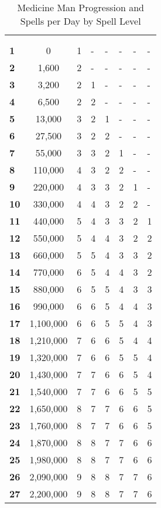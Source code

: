 \begin{multicols*}{2}
\begin {table}[H]
  \caption{Medicine Man Progression and Spells per Day by Spell Level}
  \begin{tabularx}{\columnwidth}{>{\bfseries}YcYYYYYY}
		\thead{} & \thead{} & \\
		 &  &  &  &  &  &  & \\
		1 & 0 & 1 & - & - & - & - & -\\
		2 & 1,600 & 2 & - & - & - & - & -\\
		3 & 3,200 & 2 & 1 & - & - & - & -\\
		4 & 6,500 & 2 & 2 & - & - & - & -\\
		5 & 13,000 & 3 & 2 & 1 & - & - & -\\
		6 & 27,500 & 3 & 2 & 2 & - & - & -\\
		7 & 55,000 & 3 & 3 & 2 & 1 & - & -\\
		8 & 110,000 & 4 & 3 & 2 & 2 & - & -\\
		9 & 220,000 & 4 & 3 & 3 & 2 & 1 & -\\
		10 & 330,000 & 4 & 4 & 3 & 2 & 2 & -\\
		11 & 440,000 & 5 & 4 & 3 & 3 & 2 & 1\\
		12 & 550,000 & 5 & 4 & 4 & 3 & 2 & 2\\
		13 & 660,000 & 5 & 5 & 4 & 3 & 3 & 2\\
		14 & 770,000 & 6 & 5 & 4 & 4 & 3 & 2\\
		15 & 880,000 & 6 & 5 & 5 & 4 & 3 & 3\\
		16 & 990,000 & 6 & 6 & 5 & 4 & 4 & 3\\
		17 & 1,100,000 & 6 & 6 & 5 & 5 & 4 & 3\\
		18 & 1,210,000 & 7 & 6 & 6 & 5 & 4 & 4\\
		19 & 1,320,000 & 7 & 6 & 6 & 5 & 5 & 4\\
		20 & 1,430,000 & 7 & 7 & 6 & 6 & 5 & 4\\
		21 & 1,540,000 & 7 & 7 & 6 & 6 & 5 & 5\\
		22 & 1,650,000 & 8 & 7 & 7 & 6 & 6 & 5\\
		23 & 1,760,000 & 8 & 7 & 7 & 6 & 6 & 5\\
		24 & 1,870,000 & 8 & 8 & 7 & 7 & 6 & 6\\
		25 & 1,980,000 & 8 & 8 & 7 & 7 & 6 & 6\\
		26 & 2,090,000 & 9 & 8 & 8 & 7 & 7 & 6\\
		27 & 2,200,000 & 9 & 8 & 8 & 7 & 7 & 6\\

\end{tabularx}
\end{table}
\end{multicols*}
